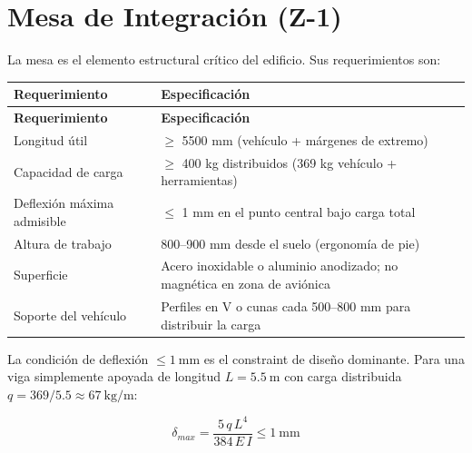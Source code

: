 \documentclass[11pt, a4paper]{article}
\begin{document}
\begin{center}
\end{center}

\section{Mesa de Integración (Z-1)}

La mesa es el elemento estructural crítico del edificio. Sus requerimientos son:

\begin{longtable}{L{5cm} L{8.5cm}}
  \color{white}\textbf{Requerimiento} &
  \color{white}\textbf{Especificación} \\
  \endfirsthead
  \color{white}\textbf{Requerimiento} &
  \color{white}\textbf{Especificación} \\
  \endhead
  Longitud útil             & $\geq$ 5500 mm (vehículo + márgenes de extremo) \\
  Capacidad de carga        & $\geq$ 400 kg distribuidos (369 kg vehículo + herramientas) \\
  Deflexión máxima admisible & $\leq$ 1 mm en el punto central bajo carga total \\
  Altura de trabajo         & 800--900 mm desde el suelo (ergonomía de pie) \\
  Superficie                & Acero inoxidable o aluminio anodizado; no magnética en zona de aviónica \\
  Soporte del vehículo      & Perfiles en V o cunas cada 500--800 mm para distribuir la carga \\
\end{longtable}

La condición de deflexión $\leq 1\ \text{mm}$ es el constraint de diseño dominante. Para una viga simplemente apoyada de longitud $L = 5.5\ \text{m}$ con carga distribuida $q = 369/5.5 \approx 67\ \text{kg/m}$:

\begin{equation}
  \delta_{max} = \frac{5\,q\,L^4}{384\,E\,I} \leq 1\ \text{mm}
\end{equation}
\end{document}
